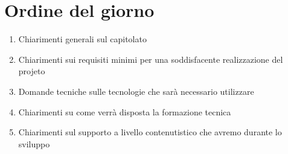 \documentclass[a4paper,12pt]{article}
\begin{document}
\section{Ordine del giorno}

\begin{enumerate}
    \item Chiarimenti generali sul capitolato
    \item Chiarimenti sui requisiti minimi per una soddisfacente realizzazione del projeto
    \item Domande tecniche sulle tecnologie che sarà necessario utilizzare
    \item Chiarimenti su come verrà disposta la formazione tecnica
    \item Chiarimenti sul supporto a livello contenutistico che avremo durante lo sviluppo
\end{enumerate}
\end{document}
